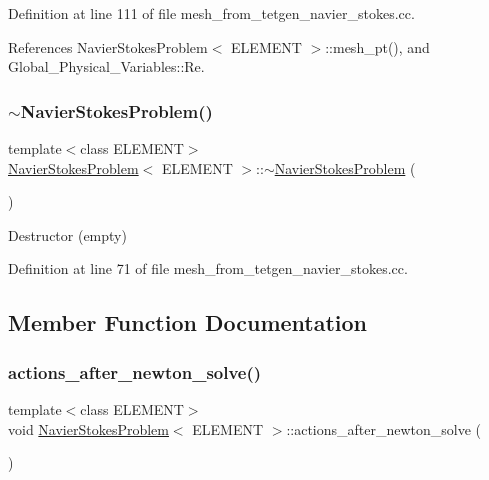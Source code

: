 Definition at line 111 of file mesh\+\_\+from\+\_\+tetgen\+\_\+navier\+\_\+stokes.\+cc.



References Navier\+Stokes\+Problem$<$ E\+L\+E\+M\+E\+N\+T $>$\+::mesh\+\_\+pt(), and Global\+\_\+\+Physical\+\_\+\+Variables\+::\+Re.

\mbox{\label{classNavierStokesProblem_ac519026cc9a3ad11a1a0b702a96aa9ee}} 
\subsubsection{\texorpdfstring{$\sim$\+Navier\+Stokes\+Problem()}{~NavierStokesProblem()}}
{\footnotesize\ttfamily template$<$class E\+L\+E\+M\+E\+NT$>$ \\
\hyperlink{classNavierStokesProblem}{Navier\+Stokes\+Problem}$<$ E\+L\+E\+M\+E\+NT $>$\+::$\sim$\hyperlink{classNavierStokesProblem}{Navier\+Stokes\+Problem} (\begin{DoxyParamCaption}{ }\end{DoxyParamCaption})\hspace{0.3cm}{\ttfamily [inline]}}



Destructor (empty) 



Definition at line 71 of file mesh\+\_\+from\+\_\+tetgen\+\_\+navier\+\_\+stokes.\+cc.



\subsection{Member Function Documentation}
\mbox{\label{classNavierStokesProblem_aaf0ba897bf867aeb91dd557a577cb391}} 
\subsubsection{\texorpdfstring{actions\+\_\+after\+\_\+newton\+\_\+solve()}{actions\_after\_newton\_solve()}}
{\footnotesize\ttfamily template$<$class E\+L\+E\+M\+E\+NT$>$ \\
void \hyperlink{classNavierStokesProblem}{Navier\+Stokes\+Problem}$<$ E\+L\+E\+M\+E\+NT $>$\+::actions\+\_\+after\+\_\+newton\+\_\+solve (\begin{DoxyParamCaption}{ }\end{DoxyParamCaption})\hspace{0.3cm}{\ttfamily [inline]}}



